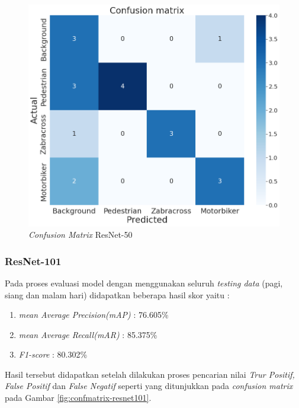 \begin{figure}[H]
	\centering
	\includegraphics[scale=0.3]{gambar/confmatrix/all-resnet50-blue.png}
	\caption{\textit{Confusion Matrix} ResNet-50}
	\label{fig:confmatrix-resnet50}
\end{figure}

\subsubsection{ResNet-101}

Pada proses evaluasi model dengan menggunakan seluruh \textit{testing data} (pagi, siang dan malam hari) didapatkan beberapa hasil skor yaitu :
\begin{enumerate}[nolistsep]
	\item \textit{mean Average Precision(mAP)} : 76.605\%
	\item \textit{mean Average Recall(mAR)} : 85.375\%
	\item \textit{F1-score} : 80.302\%
\end{enumerate}
Hasil tersebut didapatkan setelah dilakukan proses pencarian nilai \textit{Trur Positif, False Positif} dan \textit{False Negatif} seperti yang ditunjukkan pada \textit{confusion matrix} pada Gambar \ref{fig:confmatrix-resnet101}.

